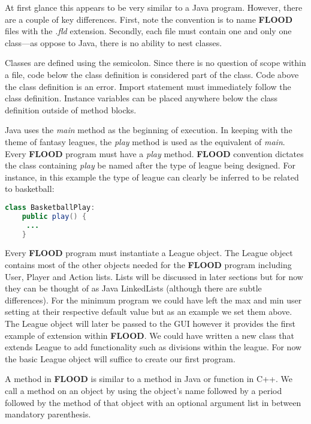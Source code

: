 \documentclass[12pt]{report}
\begin{document}
\begin{doublespace}
At first glance this appears to be very similar to a Java program. However, there are a couple of key differences. First, note the convention is to name \textbf{FLOOD} files with the \textit{.fld} extension. Secondly, each file must contain one and only one class---as oppose to Java, there is no ability to nest classes.

Classes are defined using the semicolon. Since there is no question of scope within a file, code below the class definition is considered part of the class. Code above the class definition is an error. Import statement must immediately follow the class definition. Instance variables can be placed anywhere below the class definition outside of method blocks.

Java uses the \textit{main} method as the beginning of execution. In keeping with the theme of fantasy leagues, the \textit{play} method is used as the equivalent of \textit{main}. Every \textbf{FLOOD} program must have a \textit{play} method. \textbf{FLOOD} convention dictates the class containing \textit{play} be named after the type of league being designed. For instance, in this example the type of league can clearly be inferred to be related to basketball:
\end{doublespace}

\begin{lstlisting}[language=Java,label=some-code,caption=BasketballPlay.fld]
class BasketballPlay:
	public play() {
	 ...
	}
\end{lstlisting}

\begin{doublespace}
Every \textbf{FLOOD} program must instantiate a League object. The League object contains most of the other objects needed for the \textbf{FLOOD} program including User, Player and Action lists. Lists will be discussed in later sections but for now they can be thought of as Java LinkedLists (although there are subtle differences). For the minimum program we could have left the max and min user setting at their respective default value but as an example we set them above. The League object will later be passed to the GUI however it provides the first example of extension within \textbf{FLOOD}. We could have written a new class that extends League to add functionality such as divisions within the league. For now the basic League object will suffice to create our first program.

A method in \textbf{FLOOD} is similar to a method in Java or function in C++. We call a method on an object by using the object's name followed by a period followed by the method of that object with an optional argument list in between mandatory parenthesis.
\end{doublespace}
\end{document}
